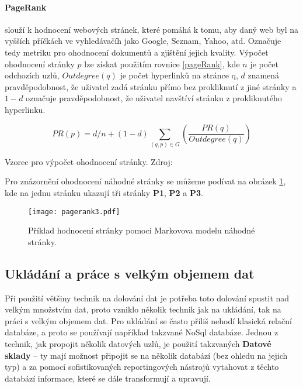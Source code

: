 \paragraph{PageRank} slouží k hodnocení webových stránek, které pomáhá k tomu, aby daný web byl na vyšších příčkách ve vyhledávačíh jako Google, Seznam, Yahoo, atd. Označuje tedy metriku pro ohodnocení dokumentů a zjištění jejich kvality. Výpočet ohodnocení stránky \(p\) lze získat použitím rovnice \ref{pageRank}, kde \(n\) je počet odchozích uzlů, \(Outdegree(q)\) je počet hyperlinků na stránce q, \(d\) znamená pravděpodobnost, že uživatel zadá stránku přímo bez prokliknutí z jiné stránky a \(1 - d\) označuje pravděpodobnost, že uživatel navštíví stránku z prokliknutého hyperlinku. \cite{minigbook}
\begin{equationcap}
\begin{equation} \label{pageRank}
PR(p) = d/n + (1-d) \sum_{(q,p) \in G}(\frac{PR(q)}{Outdegree(q)})
\end{equation}
\caption[Vzorec pro výpočet ohodnocení stránky]{Vzorec pro výpočet ohodnocení stránky. Zdroj: \cite{data-mining-principles}}
\end{equationcap}

\par Pro znázornění ohodnocení náhodné stránky se můžeme podívat na obrázek \ref{pageRankFig}, kde na jednu stránku ukazují tři stránky \textbf{P1}, \textbf{P2} a \textbf{P3}.
\begin{figure}[htp]
\centering
\texttt{[image: pagerank3.pdf]}
\caption{Příklad hodnocení stránky pomocí Markovova modelu náhodné stránky.}
\label{pageRankFig}
\end{figure}

\subsection{Ukládání a práce s velkým objemem dat}
\par Při použití většiny technik na dolování dat je potřeba toto dolování spustit nad velkým množstvím dat, proto vzniklo několik technik jak na ukládání, tak na práci s velkým objemem dat. Pro ukládání se často příliš nehodí klasická relační databáze, a proto se používají například takzvané NoSql databáze. Jednou z technik, jak propojit několik datových uzlů, je použití takzvaných \textbf{Datové sklady} -- ty mají možnost připojit se na několik databází (bez ohledu na jejich typ) a za pomocí sofistikovaných reportingových nástrojů vytahovat z těchto databází informace, které se dále transformují a upravují. \cite{nosql}

